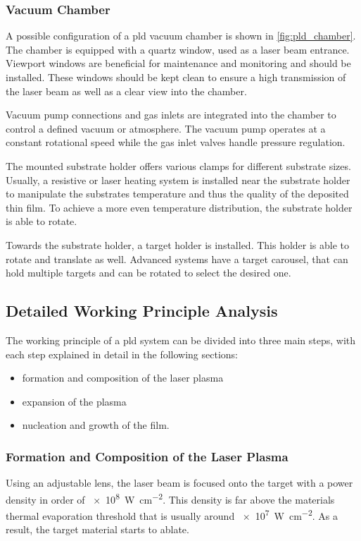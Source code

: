 \subsubsection{Vacuum Chamber}
A possible configuration of a \ac{pld} vacuum chamber is shown in 
\cref{fig:pld_chamber}.
The chamber is equipped with a quartz window, used as a laser beam entrance.
Viewport windows are beneficial for maintenance and monitoring and should
be installed.
These windows should be kept clean to ensure a high transmission of the laser beam
as well as a clear view into the chamber.

Vacuum pump connections and gas inlets are integrated into the chamber
to control a defined vacuum or atmosphere.
The vacuum pump operates at a constant rotational speed while the 
gas inlet valves handle pressure regulation. 

The mounted substrate holder offers various clamps for different substrate sizes.
Usually, a resistive or laser heating system is installed near the substrate holder to
manipulate the substrates temperature and thus the quality of the deposited thin film.
To achieve a more even temperature distribution, the substrate holder is able to rotate.

Towards the substrate holder, a target holder is installed.
This holder is able to rotate and translate as well.
Advanced systems have a target carousel, that can hold multiple targets and can be
rotated to select the desired one.

\subsection{Detailed Working Principle Analysis}
The working principle of a \ac{pld} system can be divided into three main steps, with
each step explained in detail in the following sections:
\begin{itemize}
	\item formation and composition of the laser plasma
	\item expansion of the plasma
	\item nucleation and growth of the film.
\end{itemize}

\subsubsection{Formation and Composition of the Laser Plasma}
Using an adjustable lens, the laser beam is focused onto the target 
with a power density in order of \qty{e8}{\watt\per\centi\meter\squared}.
This density is far above the materials thermal evaporation threshold that is usually 
around \qty{e7}{\watt\per\centi\meter\squared}.
As a result, the target material starts to ablate.

